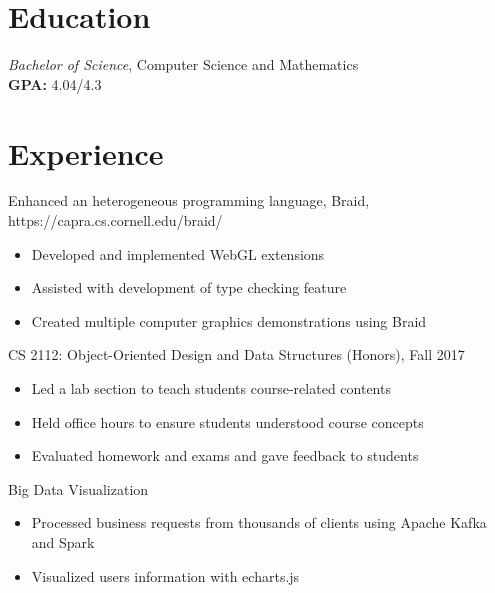 \documentclass{resume}
\begin{document}



\section{Education}
\textit{Bachelor of Science}, Computer Science and Mathematics\\
\textbf{GPA: }4.04/4.3

\section{Experience}
Enhanced an heterogeneous programming language, Braid, https://capra.cs.cornell.edu/braid/
\begin{itemize}
  \item Developed and implemented WebGL extensions
  \item Assisted with development of type checking feature
  \item Created multiple computer graphics demonstrations using Braid
\end{itemize}

CS 2112: Object-Oriented Design and Data Structures (Honors), Fall 2017
\begin{itemize}
  \item Led a lab section to teach students course-related contents
  \item Held office hours to ensure students understood course concepts
  \item Evaluated homework and exams and gave feedback to students
\end{itemize}

Big Data Visualization
\begin{itemize}
  \item Processed business requests from thousands of clients using Apache Kafka and Spark
  \item Visualized users information with echarts.js 
\end{itemize}
\end{document}
